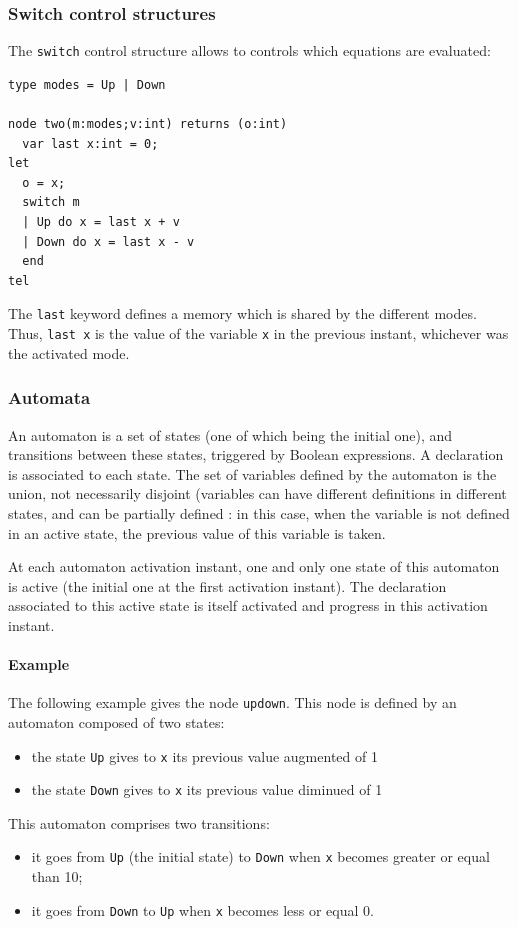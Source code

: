 \documentclass[a4paper]{article}
\begin{document}
\subsubsection{Switch control structures}
\label{sec:switch-contr-struct}

The \texttt{switch} control structure allows to controls which equations are
evaluated:

\begin{lstlisting}
type modes = Up | Down

node two(m:modes;v:int) returns (o:int)
  var last x:int = 0;
let
  o = x;
  switch m
  | Up do x = last x + v
  | Down do x = last x - v
  end
tel
\end{lstlisting}

The \texttt{last} keyword defines a memory which is shared by the different
modes. Thus, \lstinline|last x| is the value of the variable \texttt{x} in the
previous instant, whichever was the activated mode.

\subsubsection{Automata}
\label{sec:automata}

An automaton is a set of states (one of which being the initial one), and
transitions between these states, triggered by Boolean expressions. A
declaration is associated to each state. The set of variables defined by the
automaton is the union, not necessarily disjoint (variables can have different
definitions in different states, and can be partially defined : in this case,
when the variable is not defined in an active state, the previous value of this
variable is taken.

At each automaton activation instant, one and only one state of this automaton
is active (the initial one at the first activation instant). The declaration
associated to this active state is itself activated and progress in this
activation instant.

\paragraph{Example}
\label{sec:example}

The following example gives the node \texttt{updown}. This node is defined by an
automaton composed of two states:
\begin{itemize}
\item the state \texttt{Up} gives to \texttt{x} its previous value augmented of 1
\item the state \texttt{Down} gives to \texttt{x} its previous value diminued of 1
\end{itemize}
This automaton comprises two transitions:
\begin{itemize}
\item it goes from \texttt{Up} (the initial state) to \texttt{Down} when
  \texttt{x} becomes greater or equal than 10;
\item it goes from \texttt{Down} to \texttt{Up} when \texttt{x} becomes less or
  equal 0.
\end{itemize}
\end{document}
